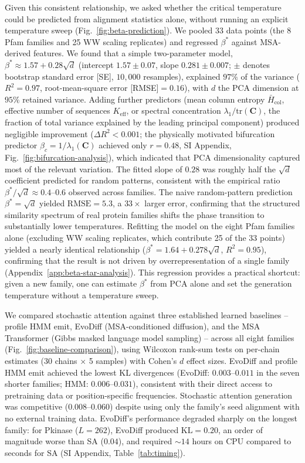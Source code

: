 Given this consistent relationship, we asked whether the critical temperature could be predicted from alignment statistics alone, without running an explicit temperature sweep (Fig.~\ref{fig:beta-prediction}). We pooled 33 data points (the 8 Pfam families and 25 WW scaling replicates) and regressed $\beta^*$ against MSA-derived features. We found that a simple two-parameter model, $\beta^* \approx 1.57 + 0.28\sqrt{d}$ (intercept $1.57 \pm 0.07$, slope $0.281 \pm 0.007$; $\pm$ denotes bootstrap standard error [SE], $10{,}000$ resamples), explained $97\%$ of the variance ($R^2{=}0.97$, root-mean-square error [RMSE]${=}0.16$), with $d$ the PCA dimension at $95\%$ retained variance. Adding further predictors (mean column entropy $\bar{H}_{\mathrm{col}}$, effective number of sequences $K_{\mathrm{eff}}$, or spectral concentration $\lambda_1/\mathrm{tr}(\mathbf{C})$, the fraction of total variance explained by the leading principal component) produced negligible improvement ($\Delta R^2 < 0.001$; the physically motivated bifurcation predictor $\beta_c = 1/\lambda_1(\mathbf{C})$ achieved only $r{=}0.48$, SI Appendix, Fig.~\ref{fig:bifurcation-analysis}), which indicated that PCA dimensionality captured most of the relevant variation. The fitted slope of $0.28$ was roughly half the $\sqrt{d}$ coefficient predicted for random patterns, consistent with the empirical ratio $\beta^*/\sqrt{d} \approx 0.4$--$0.6$ observed across families. The naive random-pattern prediction $\beta^* = \sqrt{d}$ yielded $\mathrm{RMSE}{=}5.3$, a $33\times$ larger error, confirming that the structured similarity spectrum of real protein families shifts the phase transition to substantially lower temperatures. Refitting the model on the eight Pfam families alone (excluding WW scaling replicates, which contribute 25 of the 33 points) yielded a nearly identical relationship ($\beta^* = 1.64 + 0.278\sqrt{d}$, $R^2{=}0.95$), confirming that the result is not driven by overrepresentation of a single family (Appendix~\ref{app:beta-star-analysis}). This regression provides a practical shortcut: given a new family, one can estimate $\beta^*$ from PCA alone and set the generation temperature without a temperature sweep.

We compared stochastic attention against three established learned baselines -- profile HMM emit, EvoDiff (MSA-conditioned diffusion), and the MSA Transformer (Gibbs masked language model sampling) -- across all eight families (Fig.~\ref{fig:baseline-comparison}), using Wilcoxon rank-sum tests on per-chain estimates (30 chains $\times$ 5 samples) with Cohen's $d$ effect sizes. EvoDiff and profile HMM emit achieved the lowest KL divergences (EvoDiff: $0.003$--$0.011$ in the seven shorter families; HMM: $0.006$--$0.031$), consistent with their direct access to pretraining data or position-specific frequencies. Stochastic attention generation was competitive ($0.008$--$0.060$) despite using only the family's seed alignment with no external training data. EvoDiff's performance degraded sharply on the longest family: for Pkinase ($L{=}262$), EvoDiff produced $\mathrm{KL}{=}0.20$, an order of magnitude worse than SA ($0.04$), and required ${\sim}14$ hours on CPU compared to seconds for SA (SI Appendix, Table~\ref{tab:timing}).

